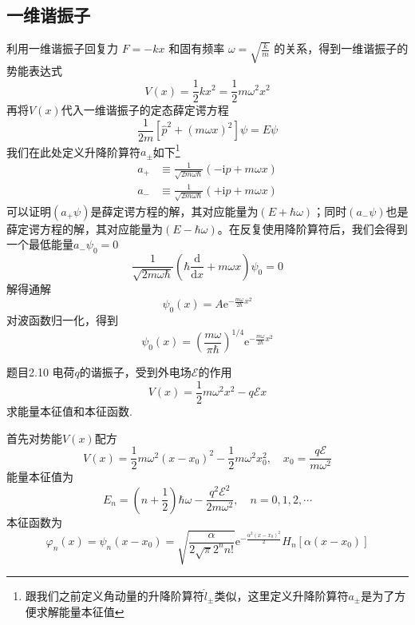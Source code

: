 \subsection{一维谐振子}
利用一维谐振子回复力 $F=-kx$ 和固有频率 $\omega=\sqrt{\frac{k}{m}}$ 的关系，得到一维谐振子的势能表达式
$$
    V(x)=\frac{1}{2}kx^2=\frac{1}{2}m\omega^2x^2
$$
再将$V(x)$代入一维谐振子的定态薛定谔方程
$$
    \frac{1}{2m}\left[ \hat{p}^2+(m\omega x)^2 \right]\psi=E\psi
$$
我们在此处定义升降阶算符$a_{\pm}$如下\footnote{跟我们之前定义角动量的升降阶算符$\hat{l}_{\pm}$类似，这里定义升降阶算符$a_{\pm}$是为了方便求解能量本征值}
$$
    \begin{aligned}
        a_{+} & \equiv \frac{1}{\sqrt{2m\omega\hbar}}\left(-\mathrm{i}p+m\omega x \right) \\
        a_{-} & \equiv \frac{1}{\sqrt{2m\omega\hbar}}\left(+\mathrm{i}p+m\omega x \right)
    \end{aligned}
$$
可以证明$(a_{+}\psi)$是薛定谔方程的解，其对应能量为$(E+\hbar\omega)$；同时$(a_{-}\psi)$也是薛定谔方程的解，其对应能量为$(E-\hbar\omega)$。在反复使用降阶算符后，我们会得到一个最低能量$a_{-}\psi_0=0$
$$
    \frac{1}{\sqrt{2m\omega\hbar}}\left(\hbar\frac{\mathrm{d}}{\mathrm{d}x}+m\omega x\right)\psi_0=0
$$
解得通解
$$
    \psi_0(x)=A\mathrm{e}^{-\frac{m\omega}{2\hbar}x^2}
$$
对波函数归一化，得到
$$
    \psi_0(x)=\left(\frac{m\omega}{\pi\hbar}\right)^{1/4}\mathrm{e}^{-\frac{m\omega}{2\hbar}x^2}
$$
\begin{question}{题目2.10}
    电荷$q$的谐振子，受到外电场$\mathcal{E}$的作用
    $$
        V(x)=\frac{1}{2}m\omega^2x^2-q\mathcal{E}x
    $$
    求能量本征值和本征函数.
\end{question}
\begin{solution}
    首先对势能$V(x)$配方
    $$
        V(x)=\frac{1}{2}m\omega^2(x-x_0)^2-\frac{1}{2}m\omega^2x_0^2,
        \quad
        x_0=\frac{q\mathcal{E}}{m\omega^2}
    $$
    能量本征值为
    $$
        E_n = \left(n+\frac{1}{2}\right)\hbar\omega-\frac{q^2\mathcal{E}^2}{2m\omega^2}, \quad n = 0, 1, 2, \cdots
    $$
    本征函数为
    $$
        \varphi_n(x)
        = \psi_n(x-x_0)
        = \sqrt{\frac{\alpha}{2\sqrt{\pi}2^nn!}}\mathrm{e}^{-\frac{\alpha^2(x-x_0)^2}{2}}H_n[\alpha(x-x_0)]
    $$
\end{solution}



